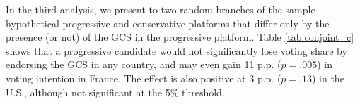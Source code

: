 \documentclass{nature}
\begin{document}
In the third analysis, we present to two random branches of the sample hypothetical progressive and conservative platforms that differ only by the presence (or not) of the GCS in the progressive platform. Table \ref{tab:conjoint_c} shows that a progressive candidate would not significantly lose voting share by endorsing the GCS in any country, and may even gain 11 p.p. ($p = .005$) in voting intention in France. The effect is also positive at 3 p.p. ($p = .13$) in the U.S., although not significant at the 5\% threshold. %

\end{document}
